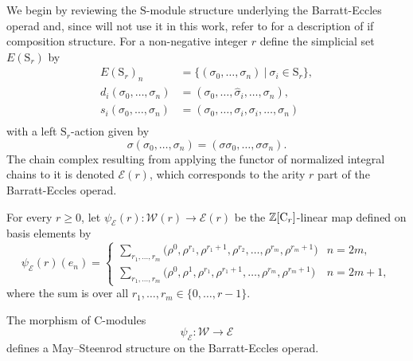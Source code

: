 We begin by reviewing the $\mathrm{S}$-module structure underlying the Barratt-Eccles operad and, since will not use it in this work, refer to \cite{berger04combinatorial} for a description of if composition structure.
For a non-negative integer $r$ define the simplicial set $E(\mathrm S_r)$ by 
\begin{equation} \label{eq: milnor model of symmetric}
\begin{split}
E(\mathrm S_r)_n &= \{ (\sigma_0, \dots, \sigma_n)\ |\ \sigma_i \in \mathrm{S}_r\}, \\
d_i(\sigma_0, \dots, \sigma_n) &= (\sigma_0, \dots, \widehat{\sigma}_i, \dots, \sigma_n), \\
s_i(\sigma_0, \dots, \sigma_n) &= (\sigma_0, \dots, \sigma_i, \sigma_i, \dots, \sigma_n) \\
\end{split}
\end{equation}
with a left $\mathrm S_r$-action given by
\begin{equation*}
\sigma (\sigma_0, \dots, \sigma_n) = (\sigma \sigma_0, \dots, \sigma \sigma_n).
\end{equation*} 
The chain complex resulting from applying the functor of normalized integral chains to it is denoted $\mathcal E(r)$, which corresponds to the arity $r$ part of the Barratt-Eccles operad.

\begin{definition} \label{def: Steenrod-Adem on Barratt-Eccles}
	For every $r \geq 0$, let $\psi_{\mathcal E}(r) \colon \mathcal W(r) \to \mathcal E(r)$ be the $\mathbb{Z}[\mathrm{C}_r]$-linear map defined on basis elements by 
	\begin{equation*}
	\psi_{\mathcal E}(r)(e_{n}) = \begin{cases}
	\displaystyle{\sum_{r_1, \dots, r_m}} \big(\rho^0, \rho^{r_1}, \rho^{r_1+1}, \rho^{r_2}, \dots, \rho^{r_{m}}, \rho^{r_{m}+1} \big) & n = 2m, \\
	\displaystyle{\sum_{r_1, \dots, r_m}} \big(\rho^0, \rho^1, \rho^{r_1}, \rho^{r_1+1}, \dots, \rho^{r_{m}}, \rho^{r_{m}+1} \big) & n = 2m+1,
	\end{cases}
	\end{equation*}
	where the sum is over all $r_1, \dots, r_m \in \{0, \dots, r-1\}$.
\end{definition}

\begin{theorem} \label{thm: Steenrod-Adem on Barratt-Eccles}
	The morphism of $\mathrm{C}$-modules
	\begin{equation*}
	\psi_{\mathcal E} \colon \mathcal W \to \mathcal E
	\end{equation*}
	defines a May--Steenrod structure on the Barratt-Eccles operad.
\end{theorem}

